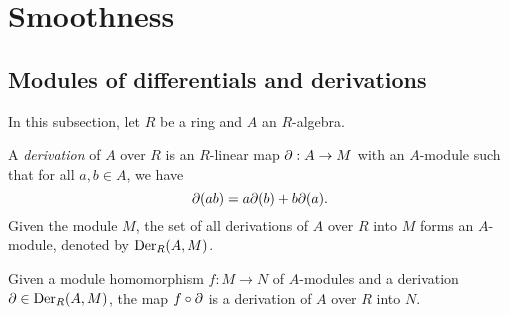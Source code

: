 \section{Smoothness}

\subsection{Modules of differentials and derivations}

    In this subsection, let $R$ be a ring and $A$ an $R$-algebra.

    \begin{definition}[Derivation]\label{def: derivation}
        A \emph{derivation} of $A$ over $R$ is an $R$-linear map $\P: A \to M$ with an $A$-module such that for all $a, b \in A$, we have
        \[
            \P(ab) = a\P(b) + b\P(a).
        \]
        Given the module $M$, the set of all derivations of $A$ over $R$ into $M$ forms an \(A\)-module, denoted by $\Der_R(A, M)$.
    \end{definition}

    Given a module homomorphism \(f: M \to N\) of \(A\)-modules and a derivation \(\P \in \Der_R(A, M)\), the map $f \circ \P$ is a derivation of \(A\) over \(R\) into \(N\).

